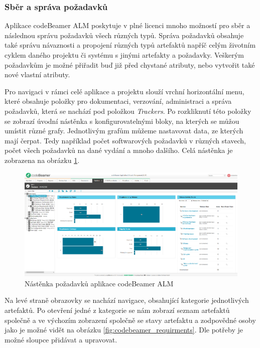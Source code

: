 \documentclass[czech,master,public,dept460,male,cpdeclaration,oneside]{diploma}
\begin{document}
\subsubsection{Sběr a správa požadavků}
Aplikace codeBeamer ALM poskytuje v plné licenci mnoho možností pro sběr a následnou správu požadavků všech různých typů. Správa požadavků obsahuje také správu návaznosti a propojení různých typů artefaktů napříč celým životním cyklem daného projektu či systému s jinými artefakty a požadavky. Veškerým požadavkům je možné přiřadit buď již před chystané atributy, nebo vytvořit také nové vlastní atributy. 

Pro navigaci v rámci celé aplikace a projektu slouží vrchní horizontální menu, které obsahuje položky pro dokumentaci, verzování, administraci a správa požadavků, která se nachází pod položkou \textit{Trackers}. Po rozkliknutí této položky se zobrazí úvodní nástěnka s konfigurovatelnými bloky, na kterých se můžou umístit různé grafy. Jednotlivým grafům můžeme nastavovat data, ze kterých mají čerpat. Tedy například počet softwarových požadavků v různých stavech, počet všech požadavků na dané vydání a mnoho dalšího. Celá nástěnka je zobrazena na obrázku \ref{fig:codebeamer_trackers}.

\begin{figure}[!ht]
    \centering
    \includegraphics[width=1\textwidth]{Diplomka/Figures/codebeamer_trackers.png}
    \caption{Nástěnka požadavků aplikace codeBeamer ALM}
    \label{fig:codebeamer_trackers}
\end{figure}

Na levé straně obrazovky se nachází navigace, obsahující kategorie jednotlivých artefaktů. Po otevření jedné z kategorie se nám zobrazí seznam artefaktů společně a ve výchozím zobrazení společně se stavy artefaktu a zodpovědné osoby jako je možné vidět na obrázku \ref{fig:codebeamer_requirments}. Dle potřeby je možné sloupce přidávat a upravovat.
\end{document}
